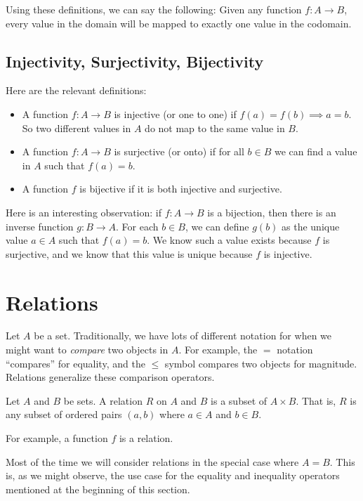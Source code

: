 Using these definitions, we can say the following: Given any function $f:A \to B$, every value in the domain will be mapped to exactly one value in the codomain.

\subsection{Injectivity, Surjectivity, Bijectivity}

Here are the relevant definitions:
\begin{itemize}
    \item A function $f:A \to B$ is injective (or one to one) if $f(a) = f(b) \implies a = b$. So two different values in $A$ do not map to the same value in $B$.
    \item A function $f:A \to B$ is surjective (or onto) if for all $b \in B$ we can find a value in $A$ such that $f(a) = b$.
    \item A function $f$ is bijective if it is both injective and surjective.
\end{itemize}

Here is an interesting observation: if $f: A \to B$ is a bijection, then there is an inverse function $g: B \to A$. For each $b \in B$, we can define $g(b)$ as the unique value $a \in A$ such that $f(a) = b$. We know such a value exists because $f$ is surjective, and we know that this value is unique because $f$ is injective.

\section{Relations}

Let $A$ be a set. Traditionally, we have lots of different notation for when we might want to \textit{compare} two objects in $A$. For example, the $=$ notation ``compares'' for equality, and the $\leq$ symbol compares two objects for magnitude. Relations generalize these comparison operators.

\begin{definition}
Let $A$ and $B$ be sets. A relation $R$ on $A$ and $B$ is a subset of $A \times B$. That is, $R$ is any subset of ordered pairs $(a, b)$ where $a \in A$ and $b \in B$.
\end{definition}

For example, a function $f$ is a relation.

Most of the time we will consider relations in the special case where $A = B$. This is, as we might observe, the use case for the equality and inequality operators mentioned at the beginning of this section.

